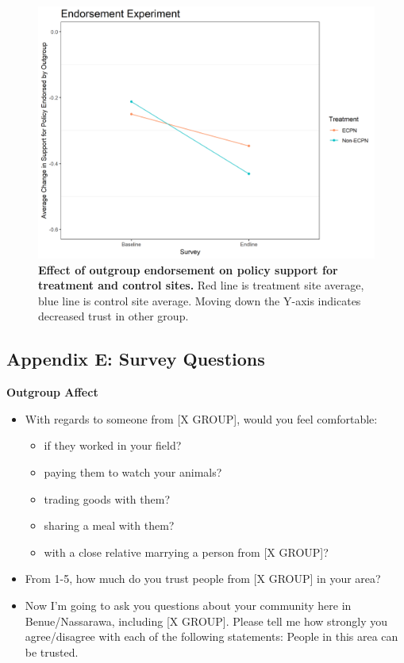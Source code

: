 \documentclass[11pt]{article}
\providecommand{\tightlist}{%
  \setlength{\itemsep}{0pt}\setlength{\parskip}{0pt}}
\begin{document}
\begin{figure}[H]
\centering
\includegraphics[width=.7\textwidth]{../../../figs/endComm_plot.png}
\caption{\label{fig:end1} \textbf{Effect of outgroup endorsement on policy support for treatment and control sites.} Red line is treatment site average, blue line is control site average.  Moving down the Y-axis indicates decreased trust in other group.}
\end{figure}

\hypertarget{appendix-e-survey-questions}{%
\subsection{Appendix E: Survey
Questions}\label{appendix-e-survey-questions}}

\textbf{Outgroup Affect}

\begin{itemize}
\tightlist
\item
  With regards to someone from {[}X GROUP{]}, would you feel
  comfortable:

  \begin{itemize}
  \tightlist
  \item
    if they worked in your field?
  \item
    paying them to watch your animals?
  \item
    trading goods with them?
  \item
    sharing a meal with them?
  \item
    with a close relative marrying a person from {[}X GROUP{]}?
  \end{itemize}
\item
  From 1-5, how much do you trust people from {[}X GROUP{]} in your
  area?
\item
  Now I'm going to ask you questions about your community here in
  Benue/Nassarawa, including {[}X GROUP{]}. Please tell me how strongly
  you agree/disagree with each of the following statements: People in
  this area can be trusted.
\end{itemize}
\end{document}
